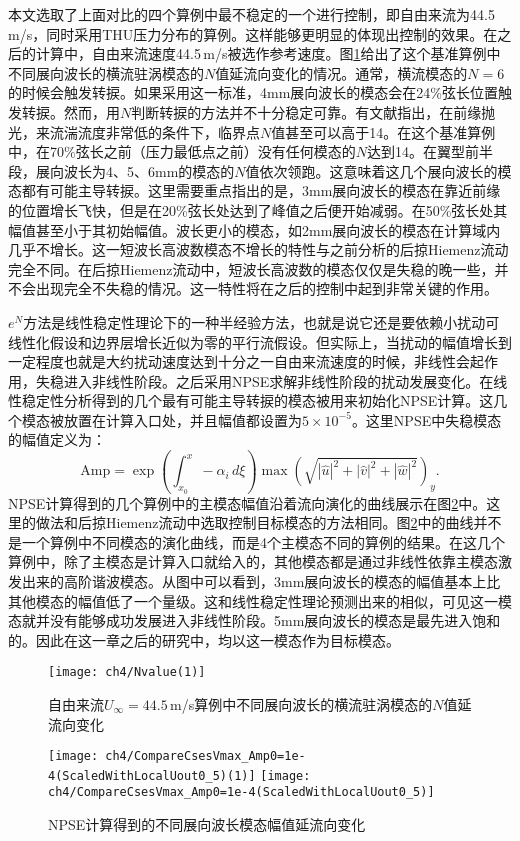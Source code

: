 本文选取了上面对比的四个算例中最不稳定的一个进行控制，即自由来流为44.5\,m/s，同时采用THU压力分布的算例。这样能够更明显的体现出控制的效果。在之后的计算中，自由来流速度44.5\,m/s被选作参考速度。图\ref{fig:Nfactor445}给出了这个基准算例中不同展向波长的横流驻涡模态的$N$值延流向变化的情况。通常，横流模态的$N=6$的时候会触发转捩。如果采用这一标准，4mm展向波长的模态会在24\%弦长位置触发转捩。然而，用$N$判断转捩的方法并不十分稳定可靠。有文献指出\cite{saric2011}，在前缘抛光，来流湍流度非常低的条件下，临界点$N$值甚至可以高于14。在这个基准算例中，在70\%弦长之前（压力最低点之前）没有任何模态的$N$达到14。在翼型前半段，展向波长为4、5、6mm的模态的$N$值依次领跑。这意味着这几个展向波长的模态都有可能主导转捩。这里需要重点指出的是，3mm展向波长的模态在靠近前缘的位置增长飞快，但是在20\%弦长处达到了峰值之后便开始减弱。在50\%弦长处其幅值甚至小于其初始幅值。波长更小的模态，如2mm展向波长的模态在计算域内几乎不增长。这一短波长高波数模态不增长的特性与之前分析的后掠Hiemenz流动完全不同。在后掠Hiemenz流动中，短波长高波数的模态仅仅是失稳的晚一些，并不会出现完全不失稳的情况。这一特性将在之后的控制中起到非常关键的作用。

$e^{N}$方法是线性稳定性理论下的一种半经验方法，也就是说它还是要依赖小扰动可线性化假设和边界层增长近似为零的平行流假设。但实际上，当扰动的幅值增长到一定程度也就是大约扰动速度达到十分之一自由来流速度的时候，非线性会起作用，失稳进入非线性阶段。之后采用NPSE求解非线性阶段的扰动发展变化。在线性稳定性分析得到的几个最有可能主导转捩的模态被用来初始化NPSE计算。这几个模态被放置在计算入口处，并且幅值都设置为$5\times10^{-5}$。这里NPSE中失稳模态的幅值定义为：
\begin{equation}
\mathrm{Amp}=\exp\!\left(\int_{x_0}^x -\alpha _i\,d\xi\right)\max\!\left(\sqrt{\left| \hat{u} \right|^2+\left| \hat{v} \right|^2+\left| \hat{w} \right|^2}\right)_y.
\end{equation}
NPSE计算得到的几个算例中的主模态幅值沿着流向演化的曲线展示在图\ref{f:NPSE}中。这里的做法和后掠Hiemenz流动中选取控制目标模态的方法相同。图\ref{f:NPSE}中的曲线并不是一个算例中不同模态的演化曲线，而是4个主模态不同的算例的结果。在这几个算例中，除了主模态是计算入口就给入的，其他模态都是通过非线性依靠主模态激发出来的高阶谐波模态。从图中可以看到，3mm展向波长的模态的幅值基本上比其他模态的幅值低了一个量级。这和线性稳定性理论预测出来的相似，可见这一模态就并没有能够成功发展进入非线性阶段。5mm展向波长的模态是最先进入饱和的。因此在这一章之后的研究中，均以这一模态作为目标模态。
\begin{figure}
\centering
  \texttt{[image: ch4/Nvalue(1)]}
  \caption{自由来流$U_\infty= 44.5$\,m/s算例中不同展向波长的横流驻涡模态的$N$值延流向变化}%
  \label{fig:Nfactor445}
\end{figure}
\begin{figure}
\centering
  \texttt{[image: ch4/CompareCsesVmax\_Amp0=1e-4(ScaledWithLocalUout0\_5)(1)]} \texttt{[image: ch4/CompareCsesVmax\_Amp0=1e-4(ScaledWithLocalUout0\_5)]}
  \caption{NPSE计算得到的不同展向波长模态幅值延流向变化}\label{f:NPSE}%
\end{figure}


